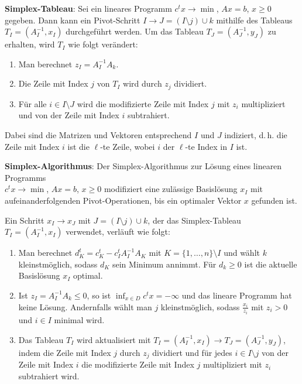 \textbf{Simplex-Tableau}:
Sei ein lineares Programm $c^t x \rightarrow \min$, $Ax = b$, $x \ge 0$
gegeben.
Dann kann ein Pivot-Schritt $I \rightarrow J = (I \setminus j) \cup k$
mithilfe des Tableaus $T_I = (A_I^{-1}, x_I)$ durchgeführt werden.
Um das Tableau $T_J = (A_J^{-1}, y_J)$ zu erhalten, wird $T_I$ wie folgt
verändert:
\begin{enumerate}
    \item
    Man berechnet $z_I = A_I^{-1} A_k$.

    \item
    Die Zeile mit Index $j$ von $T_I$ wird durch $z_j$ dividiert.

    \item
    Für alle $i \in I \setminus J$ wird die modifizierte Zeile mit Index $j$
    mit $z_i$ multipliziert und von der Zeile mit Index $i$ subtrahiert.
\end{enumerate}
Dabei sind die Matrizen und Vektoren entsprechend $I$ und $J$ indiziert,
d.\,h. die Zeile mit Index $i$ ist die $\ell$-te Zeile, wobei $i$ der
$\ell$-te Index in $I$ ist.

\linie

\textbf{Simplex-Algorithmus}:
Der Simplex-Algorithmus zur Lösung eines linearen Programms \\
$c^t x \rightarrow \min$, $Ax = b$, $x \ge 0$
modifiziert eine zulässige Basislösung $x_I$ mit aufeinanderfolgenden
Pivot-Operationen, bis ein optimaler Vektor $x$ gefunden ist.

Ein Schritt $x_I \rightarrow x_J$ mit $J = (I \setminus j) \cup k$,
der das Simplex-Tableau $T_I = (A_I^{-1}, x_I)$ verwendet, verläuft wie folgt:
\begin{enumerate}
    \item
    Man berechnet $d_K^t = c_K^t - c_I^t A_I^{-1} A_K$ mit
    $K = \{1, \dotsc, n\} \setminus I$ und wählt $k$ kleinstmöglich,
    sodass $d_K$ sein Minimum annimmt.
    Für $d_k \ge 0$ ist die aktuelle Basislösung $x_I$ optimal.

    \item
    Ist $z_I = A_I^{-1} A_k \le 0$, so ist $\inf_{x \in D} c^t x = -\infty$
    und das lineare Programm hat keine Lösung.
    Andernfalls wählt man $j$ kleinstmöglich, sodass
    $\frac{x_i}{z_i}$ mit $z_i > 0$ und $i \in I$ minimal wird.

    \item
    Das Tableau $T_I$ wird aktualisiert mit
    $T_I = (A_I^{-1}, x_I) \rightarrow T_J = (A_J^{-1}, y_J)$, indem
    die Zeile mit Index $j$ durch $z_j$ dividiert und
    für jedes $i \in I \setminus j$ von der Zeile mit Index $i$
    die modifizierte Zeile mit Index $j$ multipliziert mit $z_i$ subtrahiert
    wird.
\end{enumerate}

